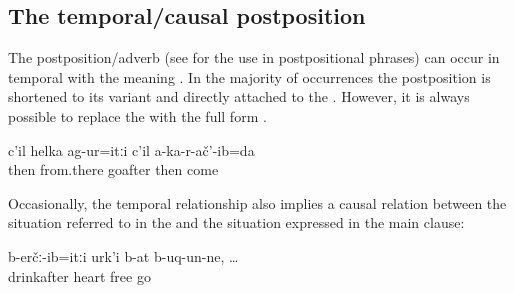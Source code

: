\subsection{The temporal/causal postposition  }
\label{sec:temporalcausal postposition hiti}

The postposition/adverb   (see  for the use in postpositional phrases) can occur in temporal  with the meaning . In the majority of occurrences the postposition is shortened to its  variant  and directly attached to the  . However, it is always possible to replace the  with the full form .
%
\begin{exe}
	\ex	\label{ex:‎‎‎After we left from there, I did not return.}
	\gll	c'il	helka	ag-ur=itːi	c'il	a-ka-r-ač'-ib=da\\
		then	from.there	goafter	then	come\\
	\glt	{}
\end{exe}

Occasionally, the temporal relationship also implies a causal relation between the situation referred to in the  and the situation expressed in the main clause:
%
\begin{exe}
	\ex	\label{ex:After drinking the heart opened}
	\gll	b-erčː-ib=itːi	urk'i	b-at	b-uq-un-ne,	\ldots\\
		drinkafter	heart	\tsc{n-}free	go\\
	\glt	{}
\end{exe}

